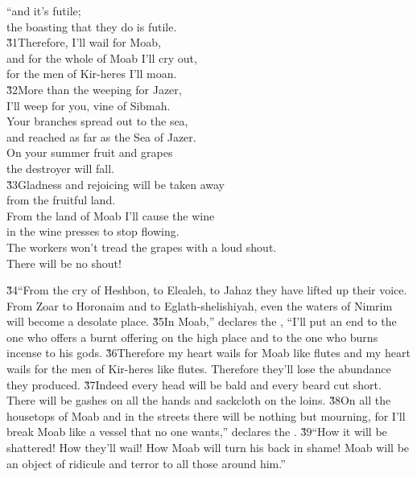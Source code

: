 \begin{poetry}
\poeml ``and it's futile; \\
\poemll    the boasting that they do is futile. \\
\poeml \v{31}Therefore, I'll wail for Moab, \\
\poemll    and for the whole of Moab I'll cry out, \\
\poemll    for the men of Kir-heres I'll moan. \\
\poeml \v{32}More than the weeping for Jazer, \\
\poemll    I'll weep for you, vine of Sibmah. \\
\poeml Your branches spread out to the sea, \\
\poemll    and reached as far as the Sea of Jazer. \\
\poeml On your summer fruit and grapes \\
\poemll    the destroyer will fall. \\
\poeml \v{33}Gladness and rejoicing will be taken away \\
\poemll    from the fruitful land. \\
\poeml From the land of Moab I'll cause the wine \\
\poemll    in the wine presses to stop flowing. \\
\poeml The workers won't tread the grapes with a loud shout. \\
\poemll    There will be no shout!
\end{poetry}

\v{34}``From the cry of Heshbon, to Elealeh, to Jahaz they have lifted up their voice. From Zoar to Horonaim and to Eglath-shelishiyah, even the waters of Nimrim will become a desolate place. \v{35}In Moab,'' declares the , ``I'll put an end to the one who offers a burnt offering on the high place and to the one who burns incense to his gods. \v{36}Therefore my heart wails for Moab like flutes and my heart wails for the men of Kir-heres like flutes. Therefore they'll lose the abundance they produced. \v{37}Indeed every head will be bald and every beard cut short. There will be gashes on all the hands and sackcloth on the loins. \v{38}On all the housetops of Moab and in the streets there will be nothing but mourning, for I'll break Moab like a vessel that no one wants,'' declares the . \v{39}``How it will be shattered! How they'll wail! How Moab will turn his back in shame! Moab will be an object of ridicule and terror to all those around him.''

